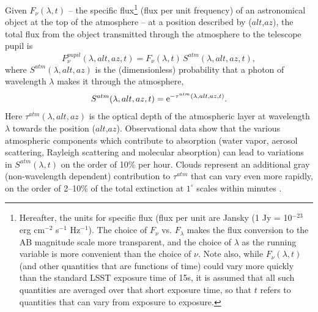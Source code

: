 \documentclass[12pt,preprint]{aastex}
\begin{document}
Given $F_\nu(\lambda, t)$ --
the specific flux\footnote{Hereafter, the units for specific
flux (flux per unit  are Jansky (1 Jy = 10$^{-23}$ erg cm$^{-2}$ s$^{-1}$
Hz$^{-1}$). The choice of $F_\nu$ vs. $F_\lambda$ makes the flux
conversion to the AB magnitude scale more transparent, and the choice
of $\lambda$ as the running variable is more convenient than the
choice of $\nu$. Note also, while $F_\nu(\lambda,t)$ (and other
quantities that are functions of time) could vary more quickly than
the standard LSST exposure time of 15s, it is assumed that all such
quantities are averaged over that short exposure time, so that $t$
refers to quantities that can vary from exposure to exposure. }
(flux per unit frequency) of an astronomical object at
the top of the atmosphere -- at a position described by ($alt$,$az$),
the total flux from the object transmitted through the atmosphere to the telescope pupil is
\begin{equation}
\label{eqn:Fpupil}
   F_\nu^{pupil}(\lambda,alt,az,t) = F_\nu(\lambda, t) \, S^{atm}(\lambda,alt,az,t),
\end{equation}
where $S^{atm}(\lambda,alt,az)$ is the (dimensionless) probability that a photon of 
wavelength $\lambda$ makes it through the atmosphere,
\begin{equation}
\label{eqn:atmTau}
   S^{atm}(\lambda,alt,az,t)   = {\rm e}^{-\tau^{atm}(\lambda,alt,az,t)}.
\end{equation}
Here $\tau^{atm}(\lambda,alt,az)$ is the optical depth of the
atmospheric layer at wavelength $\lambda$ towards the position
($alt$,$az$). Observational data \citep{Stubbs2007b, Burke2010b} show
that the various atmospheric components which contribute to absorption
(water vapor, aerosol scattering, Rayleigh scattering and molecular
absorption) can lead to variations in $S^{atm}(\lambda,t)$ on the
order of 10\% per hour. Clouds represent an additional gray (non-wavelength
dependent) contribution to $\tau^{atm}$ that can vary even more
rapidly, on the order of 2--10\% of the total extinction at $1^{\circ}$
scales within minutes \citep{Ivezic2007}.
\end{document}
